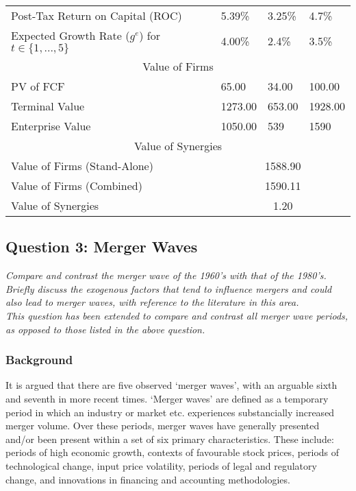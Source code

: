 \documentclass[11pt, english]{article}
\begin{document}
\begin{center}
\begin{longtable}{p{6.5cm}|p{1.5cm}p{1.5cm}p{1.5cm}}
		Post-Tax Return on Capital (ROC) & 5.39\% & 3.25\% & 4.7\%\\
		Expected Growth Rate ($g^e$) for $t\in\{1,...,5\}$ & 4.00\% & 2.4\% & 3.5\%\\
		\hline
		\hline
		\multicolumn{4}{c}{Value of Firms}\\
		\hline
		\hline
		PV of FCF & 65.00 & 34.00 & 100.00\\
		Terminal Value & 1273.00 & 653.00 & 1928.00\\
		Enterprise Value & 1050.00 & 539 & 1590\\
		\hline
		\hline
		\multicolumn{4}{c}{Value of Synergies}\\
		\hline
		\hline
		Value of Firms (Stand-Alone) & \multicolumn{3}{c}{1588.90}\\
		Value of Firms (Combined) & \multicolumn{3}{c}{1590.11}\\
		Value of Synergies & \multicolumn{3}{c}{1.20}\\
		\hline
	\end{longtable}
	\end{center}

	\newpage

	\subsection{Question 3: Merger Waves}

	\textit{Compare and contrast the merger wave of the 1960's with that of the 1980's. Briefly discuss the exogenous factors that tend to influence mergers and could also lead to merger waves, with reference to the literature in this area.}\\

	\textit{This question has been extended to compare and contrast all merger wave periods, as opposed to those listed in the above question.}

                \subsubsection*{Background}

        It is argued that there are five observed `merger waves', with an arguable sixth and seventh in more recent times. `Merger waves' are defined as a temporary period in which an industry or market etc. experiences substancially increased merger volume. Over these periods, merger waves have generally presented and/or been present within a set of six primary characteristics. These include: periods of high economic growth, contexts of favourable stock prices, periods of technological change, input price volatility, periods of legal and regulatory change, and innovations in financing and accounting methodologies.
\end{document}
